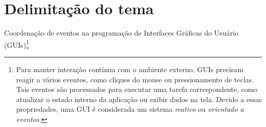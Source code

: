 \section{Delimitação do tema}\label{ldelimitacao}

Coordenação de eventos na programação de Interfaces Gráficas
do Usuário (GUIs)\footnote{
  Para manter interação contínua com o ambiente externo, GUIs
  precisam reagir a vários eventos, como cliques do mouse ou
  pressionamento de teclas.
  Tais eventos são processados para
  executar uma tarefa correspondente, como atualizar o estado interno
  da aplicação ou exibir dados na tela.
  Devido a essas propriedades, uma GUI é considerada um sistema
  \emph{reativo} ou \emph{orientado a eventos.}
}


